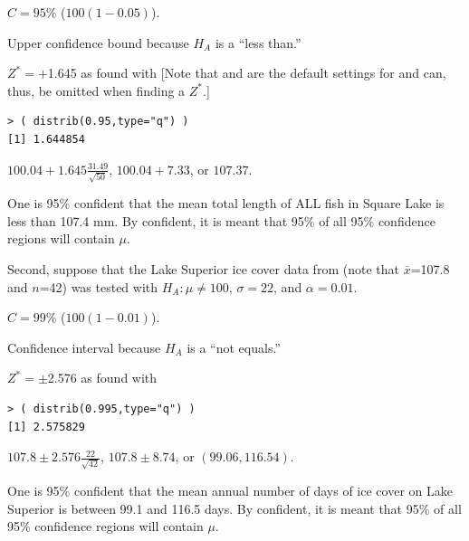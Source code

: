 \documentclass[10pt,openany]{book}\usepackage[]{graphicx}\usepackage[]{color}
\makeatletter
\newenvironment{kframe}{%
 \def\at@end@of@kframe{}%
 \ifinner\ifhmode%
  \def\at@end@of@kframe{\end{minipage}}%
  \begin{minipage}{\columnwidth}%
 \fi\fi%
 \def\FrameCommand##1{\hskip\@totalleftmargin \hskip-\fboxsep
 \colorbox{shadecolor}{##1}\hskip-\fboxsep
     \hskip-\linewidth \hskip-\@totalleftmargin \hskip\columnwidth}%
 \MakeFramed {\advance\hsize-\width
   \@totalleftmargin\z@ \linewidth\hsize
   \@setminipage}}%
 {\par\unskip\endMakeFramed%
 \at@end@of@kframe}
\newenvironment{knitrout}{}{} %
\makeatother
\begin{document}
\vspace*{-8pt}
\begin{Enumerate}
  \item $C=95$\% ($100(1-0.05)$).
  \item Upper confidence bound because $H_{A}$ is a ``less than.''
  \item $Z^{*}=+$1.645 as found with [Note that  and  are the default settings for  and can, thus, be omitted when finding a $Z^{*}$.]
\begin{knitrout}
\color{fgcolor}\begin{kframe}
\begin{verbatim}
> ( distrib(0.95,type="q") )
[1] 1.644854
\end{verbatim}
\end{kframe}
\end{knitrout}
\vspace*{6pt}
  \item $100.04+1.645\frac{31.49}{\sqrt{50}}$, $100.04+7.33$, or $107.37$.
  \item One is 95\% confident that the mean total length of ALL fish in Square Lake is less than 107.4 mm. By confident, it is meant that 95\% of all 95\% confidence regions will contain $\mu$.
\end{Enumerate}

Second, suppose that the Lake Superior ice cover data from  (note that $\bar{x}$=107.8 and $n$=42) was tested with $H_{A}:\mu \neq 100$, $\sigma=22$, and $\alpha=0.01$.

\vspace*{-8pt}
\begin{Enumerate}
  \item $C=99$\% ($100(1-0.01)$).
  \item Confidence interval because $H_{A}$ is a ``not equals.''
  \item $Z^{*}=\pm$2.576 as found with
\begin{knitrout}
\color{fgcolor}\begin{kframe}
\begin{verbatim}
> ( distrib(0.995,type="q") )
[1] 2.575829
\end{verbatim}
\end{kframe}
\end{knitrout}
\vspace*{6pt}
  \item $107.8\pm2.576\frac{22}{\sqrt{42}}$, $107.8\pm8.74$, or $(99.06,116.54)$.
  \item One is 95\% confident that the mean annual number of days of ice cover on Lake Superior is between 99.1 and 116.5 days. By confident, it is meant that 95\% of all 95\% confidence regions will contain $\mu$.
\end{Enumerate}
\end{document}
